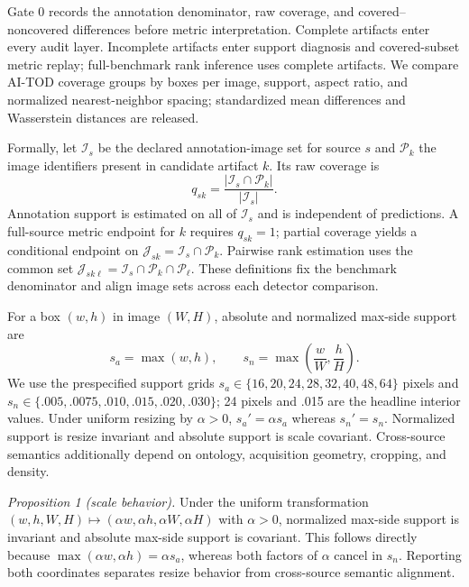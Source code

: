 \documentclass[journal]{IEEEtran}
\begin{document}
Gate 0 records the annotation denominator, raw coverage, and covered--noncovered differences before metric interpretation. Complete artifacts enter every audit layer. Incomplete artifacts enter support diagnosis and covered-subset metric replay; full-benchmark rank inference uses complete artifacts. We compare AI-TOD coverage groups by boxes per image, support, aspect ratio, and normalized nearest-neighbor spacing; standardized mean differences and Wasserstein distances are released.

Formally, let $\mathcal I_s$ be the declared annotation-image set for source $s$ and $\mathcal P_k$ the image identifiers present in candidate artifact $k$. Its raw coverage is
\begin{equation}
q_{sk}=\frac{|\mathcal I_s\cap\mathcal P_k|}{|\mathcal I_s|}.
\end{equation}
Annotation support is estimated on all of $\mathcal I_s$ and is independent of predictions. A full-source metric endpoint for $k$ requires $q_{sk}=1$; partial coverage yields a conditional endpoint on $\mathcal J_{sk}=\mathcal I_s\cap\mathcal P_k$. Pairwise rank estimation uses the common set $\mathcal J_{sk\ell}=\mathcal I_s\cap\mathcal P_k\cap\mathcal P_\ell$. These definitions fix the benchmark denominator and align image sets across each detector comparison.

For a box $(w,h)$ in image $(W,H)$, absolute and normalized max-side support are
\begin{equation}
s_a=\max(w,h),\qquad s_n=\max\left(\frac{w}{W},\frac{h}{H}\right).
\end{equation}
We use the prespecified support grids $s_a\in\{16,20,24,28,32,40,48,64\}$ pixels and $s_n\in\{.005,.0075,.010,.015,.020,.030\}$; 24 pixels and .015 are the headline interior values. Under uniform resizing by $\alpha>0$, $s_a'=\alpha s_a$ whereas $s_n'=s_n$. Normalized support is resize invariant and absolute support is scale covariant. Cross-source semantics additionally depend on ontology, acquisition geometry, cropping, and density.

\noindent\textit{Proposition 1 (scale behavior).} Under the uniform transformation $(w,h,W,H)\mapsto(\alpha w,\alpha h,\alpha W,\alpha H)$ with $\alpha>0$, normalized max-side support is invariant and absolute max-side support is covariant. This follows directly because $\max(\alpha w,\alpha h)=\alpha s_a$, whereas both factors of $\alpha$ cancel in $s_n$. Reporting both coordinates separates resize behavior from cross-source semantic alignment.
\end{document}
